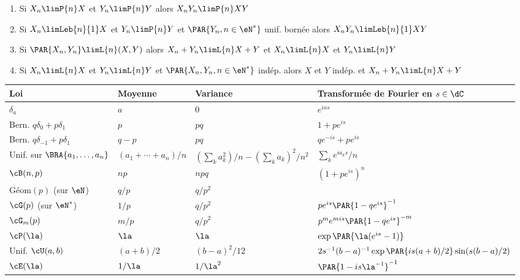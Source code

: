 \begin{enumerate}
{    l'additivité des suites convergentes en $\eP$.}.
\item Si $X_n\limP{n}X$ et $Y_n\limP{n}Y$ alors $X_nY_n\limP{n}XY$
\item Si $X_n\limLeb{n}{1}X$ et $Y_n\limP{n}Y$ et $\PAR{Y_n,n\in\eN^*}$ unif.
  bornée alors $X_nY_n\limLeb{n}{1}XY$
\item Si $\PAR{X_n,Y_n}\limL{n}(X,Y)$ alors $X_n+Y_n\limL{n}X+Y$ et
  $X_n\limL{n}X$ et $Y_n\limL{n}Y$
\item Si $X_n\limL{n}X$ et $Y_n\limL{n}Y$ et $\PAR{X_n,Y_n,n\in\eN^*}$ indép.
  alors $X$ et $Y$ indép. et $X_n+Y_n\limL{n}X+Y$
\end{enumerate}

\begin{table}[htbp]
  \begin{center}
    \begin{sideways}
    \begin{tabular}[c]{|l||l|l|l|}\hline
      Loi & Moyenne & Variance & Transformée de Fourier en $s\in\dC$\\\hline\hline
      $\delta_a$ 
      & $a$
      & $0$
      & $e^{ias}$ \\\hline
      Bern. $q\delta_0+p\delta_1$ 
      & $p$
      & $pq$
      & $1+pe^{is}$ \\\hline
      Bern. $q\delta_{-1}+p\delta_1$ 
      & $q-p$
      & $pq$
      & $qe^{-is}+pe^{is}$ \\\hline
      Unif. sur $\BRA{a_1,\ldots,a_n}$
      & $(a_1+\cdots+a_n)/n$
      & $(\sum_ka_k^2)/n-(\sum_k a_k)^2/n^2$
      & $\sum_k e^{ia_ks}/n$\\\hline
      $\cB(n,p)$
      & $np$
      & $npq$
      & $(1+pe^{is})^n$\\\hline
      Géom$(p)$ (sur $\eN$)
      & $q/p$
      & $q/p^2$
      & \\\hline
      $\cG(p)$ (sur $\eN^*$)
      & $1/p$
      & $q/p^2$
      & $pe^{is}\PAR{1-qe^{is}}^{-1}$ \\\hline
      $\cG_m(p)$
      & $m/p$
      & $q/p^2$
      & $p^me^{mis}\PAR{1-qe^{is}}^{-m}$ \\\hline
      $\cP(\la)$
      & $\la$
      & $\la$
      & $\exp\PAR{\la(e^{is}-1)}$\\\hline
      Unif. $\cU(a,b)$
      & $(a+b)/2$
      & $(b-a)^2/12$
      & $2s^{-1}(b-a)^{-1}\exp\PAR{is(a+b)/2}\sin(s(b-a)/2)$ \\\hline
      $\cE(\la)$
      & $1/\la$
      & $1/\la^2$
      & $\PAR{1-is\la^{-1}}^{-1}$ \\\hline

\end{tabular}
\end{sideways}
\end{center}
\end{table}

